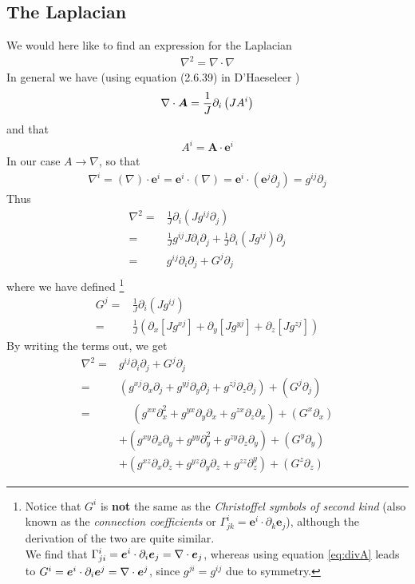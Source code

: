 \documentclass[12pt]{article}
\def\L{\left}
\def\R{\right}
\newcommand{\Grad}{\ensuremath{\nabla}}
\newcommand{\ve}[1]{\ensuremath{\boldsymbol{#1}}}
\newcommand{\Div}[1]{\ensuremath{\nabla\cdot #1 }}
\begin{document}
\subsection{The Laplacian}
%
We would here like to find an expression for the Laplacian
%
\begin{align*}
    \Grad^2 = \Div \Grad
\end{align*}
%
In general we have (using equation (2.6.39) in D'Haeseleer \cite{haeseler-1})
%
\begin{align}
    \Div \ve{A} = \frac{1}{J} \partial_i \L(JA^i\R)
    \label{eq:divA}
\end{align}
%
and that
%
\begin{align*}
    A^i = \ve{A}\cdot \ve{e}^i
\end{align*}
%
In our case $A \to \Grad$, so that
%
\begin{align*}
    \Grad^i = \L(\Grad\R)\cdot \ve{e}^i = \ve{e}^i \cdot \L(\Grad\R) = \ve{e}^i
    \cdot \L(\ve{e}^j \partial_j\R) = g^{ij} \partial_j
\end{align*}
%
Thus
%
\begin{align*}
    \Grad^2 =& \frac{1}{J} \partial_i \L(J g^{ij} \partial_j\R)\\ =&
    \frac{1}{J} g^{ij} J \partial_i \partial_j + \frac{1}{J} \partial_i \L(J
    g^{ij} \R) \partial_j\\ =& g^{ij} \partial_i \partial_j + G^j \partial_j\\
\end{align*}
%
where we have defined
%
\footnote{Notice that $G^i$ is \textbf{not} the same as the \emph{Christoffel
    symbols of second kind} (also known as the \emph{connection coefficients}
    or $\Gamma^i_{jk}=\ve{e}^i\cdot\partial_k \ve{e}_j$), although the
    derivation of the two are quite similar.\\ We find that
$\Gamma^i_{ji}=\ve{e}^i\cdot\partial_i \ve{e}_j = \Div \ve{e}_j$, whereas using
equation \ref{eq:divA} leads to $G^i=\ve{e}^i\cdot\partial_i \ve{e}^j = \Div
\ve{e}^j$, since $g^{ji}=g^{ij}$ due to symmetry.}
%
\begin{align*}
    G^j =& \frac{1}{J} \partial_i \L(J g^{ij} \R)\\ =& \frac{1}{J} \L(
    \partial_x \L[J g^{xj} \R] + \partial_y \L[J g^{yj} \R] + \partial_z \L[J
    g^{zj} \R] \R)
\end{align*}
%
By writing the terms out, we get
%
\begin{align*}
    \Grad^2 =& g^{ij} \partial_i \partial_j + G^j \partial_j\\
%
            =& \L(  g^{xj} \partial_x \partial_j + g^{yj} \partial_y \partial_j
    + g^{zj} \partial_z \partial_j\R) + \L(G^j \partial_j\R)\\
%
            =& \quad \, \L(  g^{xx} \partial_x^2 + g^{yx} \partial_y \partial_x
    + g^{zx} \partial_z \partial_x\R) + \L(G^x \partial_x\R)\\ &+ \L(  g^{xy}
    \partial_x \partial_y + g^{yy} \partial_y^2 + g^{zy} \partial_z
    \partial_y\R) + \L(G^y \partial_y\R)\\ &+ \L(  g^{xz} \partial_x \partial_z
    + g^{yz} \partial_y \partial_z + g^{zz} \partial_z^y\R) + \L(G^z
    \partial_z\R)
\end{align*}
\end{document}
